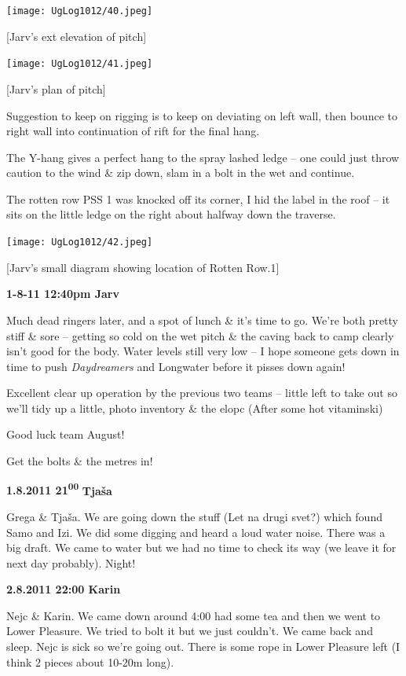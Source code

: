 \texttt{[image: UgLog1012/40.jpeg]}

{[}Jarv's ext elevation of pitch{]}

\texttt{[image: UgLog1012/41.jpeg]}

{[}Jarv's plan of pitch{]}

Suggestion to keep on rigging is to keep on deviating on left wall, then
bounce to right wall into continuation of rift for the final hang.

The Y-hang gives a perfect hang to the spray lashed ledge -- one could
just throw caution to the wind \& zip down, slam in a bolt in the wet
and continue.

The rotten row PSS 1 was knocked off its corner, I hid the label in the
roof -- it sits on the little ledge on the right about halfway down the
traverse.

\texttt{[image: UgLog1012/42.jpeg]}

{[}Jarv's small diagram showing location of Rotten Row.1{]}

\textbf{1-8-11 12:40pm Jarv}

Much dead ringers later, and a spot of lunch \& it's time to go. We're
both pretty stiff \& sore -- getting so cold on the wet pitch \& the
caving back to camp clearly isn't good for the body. Water levels still
very low -- I hope someone gets down in time to push \emph{Daydreamers}
and Longwater before it pisses down again!

Excellent clear up operation by the previous two teams -- little left to
take out so we'll tidy up a little, photo inventory \& the elopc (After
some hot vitaminski)

Good luck team August!

Get the bolts \& the metres in!

\textbf{1.8.2011 21\textsuperscript{00}} \textbf{Tjaša}

Grega \& Tjaša. We are going down the stuff (Let na drugi svet?) which
found Samo and Izi. We did some digging and heard a loud water noise.
There was a big draft. We came to water but we had no time to check its
way (we leave it for next day probably). Night!

\textbf{2.8.2011 22:00 Karin}

Nejc \& Karin. We came down around 4:00 had some tea and then we went to
Lower Pleasure. We tried to bolt it but we just couldn't. We came back
and sleep. Nejc is sick so we're going out. There is some rope in Lower
Pleasure left (I think 2 pieces about 10-20m long).

